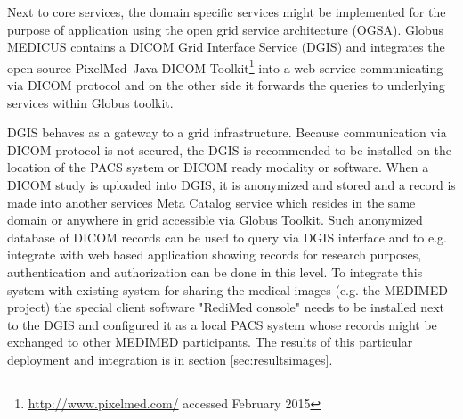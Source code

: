 Next to core services, the domain specific services might be implemented for the purpose of application using the open grid service architecture (OGSA). Globus MEDICUS \cite{Erberich2006,Erberich2007} contains a DICOM Grid Interface Service (DGIS) and integrates the open source PixelMed\texttrademark ~Java DICOM Toolkit\footnote{\url{http://www.pixelmed.com/} accessed February 2015} into a web service communicating via DICOM protocol and on the other side it forwards the queries to underlying services within Globus toolkit. 

DGIS behaves as a gateway to a grid infrastructure. Because communication via DICOM protocol is not secured, the DGIS is recommended to be installed on the location of the PACS system or DICOM ready modality or software.
When a DICOM study is uploaded into DGIS, it is anonymized and stored and a record is made into another services Meta Catalog service which resides in the same domain or anywhere in grid accessible via Globus Toolkit.
Such anonymized database of DICOM records can be used to query via DGIS interface and to e.g. integrate with web based application showing records for research purposes, authentication and authorization can be done in this level. 
To integrate this system with existing system for sharing the medical images (e.g. the MEDIMED project\cite{Slavicek2010}) the special client software "RediMed console" needs to be installed next to the DGIS and configured it as a local PACS system whose records might be exchanged to other MEDIMED participants. 
The results of this particular deployment and integration is in section \ref{sec:resultsimages}.





